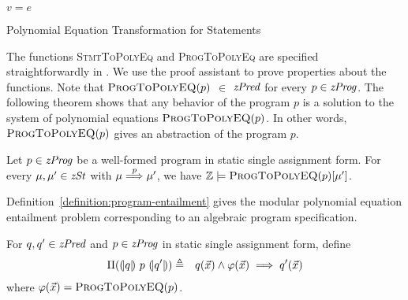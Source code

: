 \begin{algorithm}
  \begin{algorithmic}[1]
        \Return $v = e$
      \EndCase
      \EndCase
    \EndMatch
    \EndFunction
  \end{algorithmic}
  \caption{Polynomial Equation Transformation for Statements}
  \label{algorithm:polynomial-statements}
\end{algorithm}

The functions \textsc{StmtToPolyEq} and \textsc{ProgToPolyEq} are specified straightforwardly
in \gallina. We use the proof assistant \coq to prove properties
about the functions. Note that $\textsc{ProgToPolyEQ}(p)$ $\in$
$\mathit{zPred}$ for every $p \in \mathit{zProg}$. The following theorem shows that any
behavior of the program $p$ is a solution to the system of polynomial
equations $\textsc{ProgToPolyEQ}(p)$. In other words,
$\textsc{ProgToPolyEQ}(p)$ gives an abstraction of the program $p$.

\begin{theorem}
  Let $p \in \mathit{zProg}$ be a well-formed program in static single assignment
  form. For every $\mu, \mu' \in \mathit{zSt}$ with $\mu \overset{p}{\Longrightarrow} \mu'$,
  we have $\mathbb{Z} \models \textsc{ProgToPolyEQ}(p) [\mu']$.
\end{theorem}

Definition~\ref{definition:program-entailment} gives the modular
polynomial equation entailment problem corresponding to an algebraic
program specification.
\begin{definition}
  For $q, q' \in \mathit{zPred}$ and $p \in \mathit{zProg}$ in static single assignment
  form, define
  \begin{eqnarray*}
    \Pi({(\!|}{q}{|\!)}~{p}~{(\!|}{q'}{|\!)}) & \triangleq &
    q(\vec{x}) \wedge \varphi(\vec{x}) \implies q'(\vec{x})
  \end{eqnarray*}
  where $\varphi(\vec{x}) =
  \textsc{ProgToPolyEQ}(p)$.
  \label{definition:program-entailment}
\end{definition}

